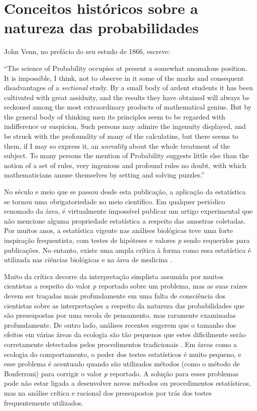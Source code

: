 \section{Conceitos históricos sobre a natureza das probabilidades}

John Venn, no prefácio do seu estudo de 1866, escreve:

``The science of Probability occupies at present a somewhat anomalous position. It is impossible, I think, not to observe
in it some of the marks and consequent disadvantages of a {\em sectional} study. By a small body of ardent students it
has been cultivated with great assiduity, and the results they have obtained will always be reckoned among the most 
extraordinary products of mathematical genius. But by the general body of thinking men its principles seem to be regarded
with indifference or suspicion. Such persons may admire the ingenuity displayed, and be struck with the profoundity
of many of the calculatins, but there seems to them, if I may so express it, an {\em unreality} about the whole treatment
of the subject. To many persons the mention of Probability suggests little else than the notion of a set of rules, very
ingenious and profound rules no doubt, with which mathematicians amuse themselves by setting and solving puzzles.''
\cite{Venn1866}

No século e meio que se passou desde esta publicação, a aplicação da estatística se tornou uma obrigatoriedade no meio científico.
Em qualquer periódico renomado da área, é virtualmente impossível publicar um artigo experimental que não 
mencione alguma propriedade
estatística a respeito das amostras coletadas. Por muitos anos, a estatística vigente nas análises biológicas teve uma
forte inspiração frequentista, com testes de hipóteses e valores {\em p} sendo requeridos para publicações. 
No entanto, existe uma ampla crítica à forma como essa estatística é
utilizada nas ciências biológicas e na área de medicina \cite{Ioannidis05}.

Muito da crítica decorre da interpretação
simplista assumida por muitos cientistas a respeito do valor {\em p} reportado sobre um problema, mas as suas raízes devem
ser traçadas mais profundamente em uma falta de consciência dos cientistas sobre as interpretações a respeito da natureza
das probabilidades que são pressupostas por uma escola de pensamento, mas raramente examinadas profundamente. 
De outro lado, análises recentes sugerem que o tamanho dos efeitos em várias áreas da ecologia são tão pequenos que estes
dificilmente serão corretamente detectados pelos procedimentos tradicionais \cite{Jennions03}. Em áreas como a ecologia do
comportamento, o poder dos testes estatísticos é muito pequeno, e esse problema é acentuado quando são utilizados métodos
(como o método de Bonferroni) para corrigir o valor {\em p} reportado. A solução para esses problemas pode não estar ligada
a desenvolver novos métodos ou procedimentos estatísticos, mas na análise crítica e racional dos pressupostos por trás
dos testes frequentemente utilizados.

